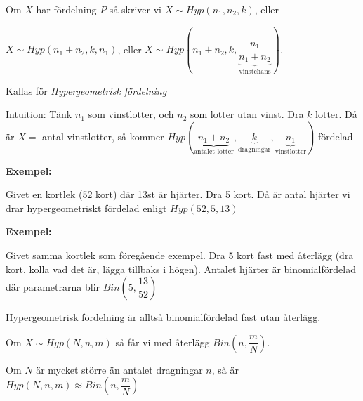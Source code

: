\par\bigskip
\noindent Om $X$ har fördelning $P$ så skriver vi $X\sim Hyp(n_1,n_2,k)$, eller\par\noindent $X\sim Hyp(n_1+n_2,k,n_1)$, eller $X\sim Hyp(n_1+n_2,k,\underbrace{\dfrac{n_1}{n_1+n_2}}_{\text{vinstchans}})$.\par
\noindent Kallas för \textit{Hypergeometrisk fördelning}
\par\bigskip
\noindent Intuition: Tänk $n_1$ som vinstlotter, och $n_2$ som lotter utan vinst. Dra $k$ lotter. Då är $X =$ antal vinstlotter, så kommer $Hyp(\underbrace{n_1+n_2}_{\text{antalet lotter}},\underbrace{k}_{\text{dragningar}},\underbrace{n_1}_{\text{vinstlotter}})$-fördelad
\par\bigskip
\noindent\textbf{Exempel:}\par
\noindent Givet en kortlek (52 kort) där 13st är hjärter. Dra 5 kort. Då är antal hjärter vi drar hypergeometriskt fördelad enligt $Hyp(52,5,13)$
\par\bigskip
\noindent\textbf{Exempel:}\par
\noindent Givet samma kortlek som föregående exempel. Dra 5 kort fast med återlägg (dra kort, kolla vad det är, lägga tillbaks i högen). Antalet hjärter är binomialfördelad där parametrarna blir $Bin(5,\dfrac{13}{52})$
\par\bigskip
\noindent Hypergeometrisk fördelning är alltså binomialfördelad fast utan återlägg.\par
\noindent Om $X\sim Hyp(N,n,m)$ så får vi med återlägg $Bin(n,\dfrac{m}{N})$.\par
\noindent Om $N$ är mycket större än antalet dragningar $n$, så är $Hyp(N,n,m)\approx Bin(n,\dfrac{m}{N})$
